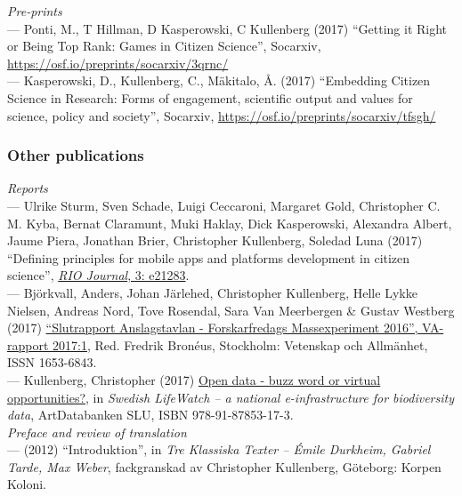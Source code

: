 \documentclass[a4paper,11pt,oneside]{article}
\begin{document}
   \noindent   \emph{Pre-prints}\\
     --- Ponti, M., T Hillman, D Kasperowski, C Kullenberg (2017) ``Getting it Right or Being Top Rank: Games in Citizen Science'', Socarxiv,
      \href{https://osf.io/preprints/socarxiv/3qrnc/}{https://osf.io/preprints/socarxiv/3qrnc/} \\
     --- Kasperowski, D., Kullenberg, C., Mäkitalo, Å. (2017) ``Embedding Citizen Science in Research: Forms of engagement, scientific output and values for science, policy and society'', Socarxiv,  \href{https://osf.io/preprints/socarxiv/tfsgh/}{https://osf.io/preprints/socarxiv/tfsgh/}\\


\subsubsection{Other publications}

   \noindent \emph{Reports}\\
   --- Ulrike Sturm, Sven Schade, Luigi Ceccaroni, Margaret Gold,
      Christopher C. M. Kyba, Bernat Claramunt, Muki Haklay, Dick Kasperowski,
      Alexandra Albert, Jaume Piera, Jonathan Brier, Christopher Kullenberg,
      Soledad Luna (2017) ``Defining principles for mobile apps and platforms development in citizen science'', \href{https://doi.org/10.3897/rio.3.e21283}{\emph{RIO Journal}, 3: e21283}.\\
   --- Björkvall, Anders, Johan Järlehed, Christopher Kullenberg, Helle Lykke Nielsen,
Andreas Nord, Tove Rosendal, Sara Van Meerbergen & Gustav Westberg (2017) \href{https://www.forskarfredag.se/filer/ff2016-anslagstavlan-slutrapport.pdf}{``Slutrapport
   Anslagstavlan - Forskarfredags Massexperiment 2016'', VA-rapport 2017:1}, Red. Fredrik Bronéus,
   Stockholm: Vetenskap och Allmänhet, ISSN 1653-6843.\\
   --- Kullenberg, Christopher (2017) \href{http://www.slu.se/globalassets/ew/subw/lifewatch/publikationer/slw-summary-report-web-170622.pdf}{Open data - buzz word or virtual opportunities?},
   in \emph{Swedish LifeWatch – a national e-infrastructure for biodiversity data}, ArtDatabanken SLU, ISBN
978-91-87853-17-3.\\



  \noindent \emph{Preface and review of translation}\\
    --- (2012) ``Introduktion'', in \emph{Tre Klassiska Texter – Émile Durkheim, Gabriel Tarde, Max Weber}, fackgranskad av Christopher Kullenberg, Göteborg: Korpen Koloni.\\
\end{document}

